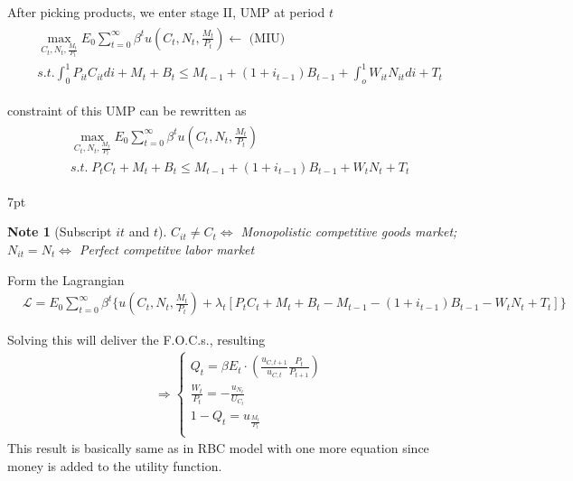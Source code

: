 \documentclass{article}
\newenvironment{blueblock}{
\def\FrameCommand{
  \hspace{1pt}
    {\color{DarkBlue}
    \vrule width 2pt}
    {\color{blueshade}
    \vrule width 4pt}
  \colorbox{blueshade}
}
\MakeFramed{
  \advance
  \hsize-
  \width
  \FrameRestore}
\noindent\hspace{-4.55pt}%
\begin{adjustwidth}{}{7pt}
\vspace{2pt}\vspace{2pt}
}
{\vspace{2pt}\end{adjustwidth}\endMakeFramed}
\newtheorem{note}{Note}
\begin{document}
After picking products, we enter stage II, UMP at period $t$ 
\begin{align}
\begin{split}
&\max_{C_{t},N_{t},\frac{M_{t}}{P_{t}}} E_{0} \sum\limits_{t=0}^{\infty} \beta^{t} u\left(C_{t},N_{t},\frac{M_{t}}{P_{t}}\right) \leftarrow\text{ (MIU)}
\\&s.t. \int_{0}^{1}P_{it}C_{it}di +M_{t}+B_{t}\leqslant M_{t-1}+(1+i_{t-1})B_{t-1}+\int_{o}^{1}W_{it}N_{it}di+T_{t}
\end{split}
\end{align}

constraint of this UMP can be rewritten as
\begin{align}
\begin{split}
&\max_{C_{t},N_{t},\frac{M_{t}}{P_{t}}} E_{0} \sum\limits_{t=0}^{\infty} \beta^{t} u\left(C_{t},N_{t},\frac{M_{t}}{P_{t}}\right)
\\&
s.t. \;P_{t}C_{t}+M_{t}+B_{t}\leqslant M_{t-1}+(1+i_{t-1})B_{t-1}+W_{t}N_{t}+T_{t}
\end{split}
\end{align}

\begin{blueblock}
\begin{note}[Subscript $it$ and $t$]
$C_{it}\neq C_t \Leftrightarrow $ Monopolistic competitive goods market; $N_{it}= N_t \Leftrightarrow $ Perfect competitve labor market
\end{note}
\end{blueblock}


Form the Lagrangian
\begin{align}
&\mathscr{L}=E_{0}\sum\limits_{t=0}^{\infty}\beta^{t} \{u(C_{t},N_{t},\frac{M_{t}}{P_{t}})+\lambda_{t}[P_{t}C_{t}+M_{t}+B_{t}-M_{t-1}-(1+i_{t-1})B_{t-1}-W_{t}N_{t}+T_{t}]\}
\end{align}

Solving this will deliver the F.O.C.s., resulting 
\begin{align}
&\Rightarrow \begin{cases} Q_{t}=\beta E_{t} \cdot (\frac{u_{C,t+1}}{u_{C,t}}\frac{P_{t}}{P_{t+1}}) \\
\frac{W_{t}}{P_{t}}=-\frac{u_{N_{t}}}{U_{C_t}} \\
1-Q_{t}=u_{\frac{M_{t}}{P_t}} \\
\end{cases}
\end{align}
This result is basically same as in RBC model with one more equation since money is added to the utility function.
\end{document}
